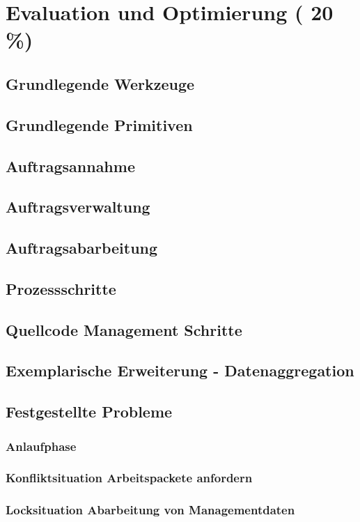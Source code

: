 \chapter{Evaluation und Optimierung ( 20 \%)}

\section{Grundlegende Werkzeuge}
\section{Grundlegende Primitiven}
\section{Auftragsannahme}
\section{Auftragsverwaltung}
\section{Auftragsabarbeitung}
\section{Prozessschritte}
\section{Quellcode Management Schritte}
\section{Exemplarische Erweiterung - Datenaggregation}

\section{Festgestellte Probleme}
\subsection{Anlaufphase}
\subsection{Konfliktsituation Arbeitspackete anfordern}
\subsection{Locksituation Abarbeitung von Managementdaten}

